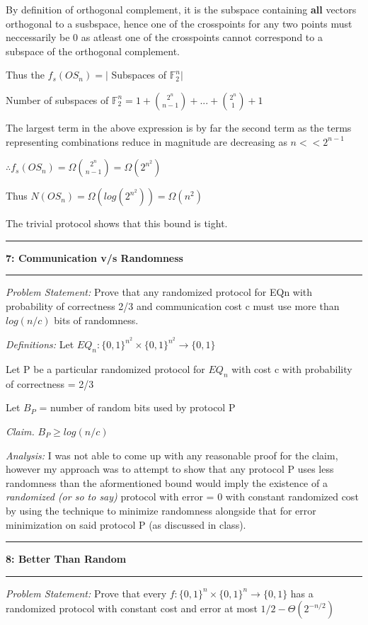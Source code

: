 \documentclass[11pt]{article}
\newcommand\question[2]{\vspace{.25in}\hrule\textbf{#1: #2}\vspace{.5em}\hrule\vspace{.10in}}
\newcommand\analysis{\vspace{.10in}\emph{Analysis: }\newline}
\newcommand\problem{\emph{Problem Statement:}\newline}
\newcommand\definitions{\emph{Definitions:}\newline}
\newcommand\claim{\emph{Claim.}\newline}
\begin{document}
By definition of orthogonal complement, it is the subspace containing \textbf{all} vectors orthogonal to a susbspace, hence one of the crosspoints for any two points must neccessarily be 0 as atleast one of the crosspoints cannot correspond to a subspace of the orthogonal complement. 

Thus the $f_s(OS_n) = \lvert$ Subspaces of $\mathbb{F}_2^n \rvert$

Number of subspaces of $\mathbb{F}_2^n = 1 + {2^n \choose n - 1} + ... + {2^n \choose 1} + 1$

The largest term in the above expression is by far the second term as the terms representing combinations reduce in magnitude are decreasing as $n << 2^{n-1}$

$\therefore f_s(OS_n) = \Omega{2^n \choose n - 1} = \Omega({2^{n^2}})$

Thus $N(OS_n) = \Omega(log(2^{n^2})) = \Omega(n^2)$

The trivial protocol shows that this bound is tight. 

\newpage

\question{7}{Communication v/s Randomness}

\problem
Prove that any randomized protocol for EQn with probability of correctness 2/3 and communication cost c must use more than $log(n/c)$ bits of randomness.

\definitions
Let $EQ_n: {\{0, 1\}}^{n^2} \times {\{0, 1\}}^{n^2} \to \{0, 1\}$

Let P be a particular randomized protocol for $EQ_n$ with cost c with probability of correctness = 2/3

Let $B_P$ = number of random bits used by protocol P 

\claim
$B_{P} \geq log(n/c)$

\analysis
I was not able to come up with any reasonable proof for the claim, however my approach was to attempt to show that any protocol P uses less randomness than the aformentioned bound would imply the existence of a \emph{randomized (or so to say)} protocol with error = 0 with constant randomized cost by using the technique to minimize randomness alongside that for error minimization on said protocol P (as discussed in class). 

\newpage
\question{8}{Better Than Random}

\problem
Prove that every $f : {\{0, 1\}}^n \times {\{0, 1\}}^n \to \{0, 1\}$ has a randomized protocol with constant cost and error at most $1/2 - \Theta(2^{-n/2})$
\end{document}
